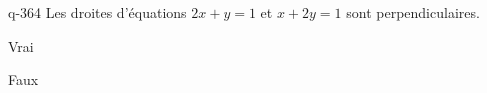 \begin{truefalse}{q-364}
Les droites d'équations $2x+y=1$ et $x+2y=1$ sont perpendiculaires.
\item Vrai
\item* Faux
\end{truefalse}

